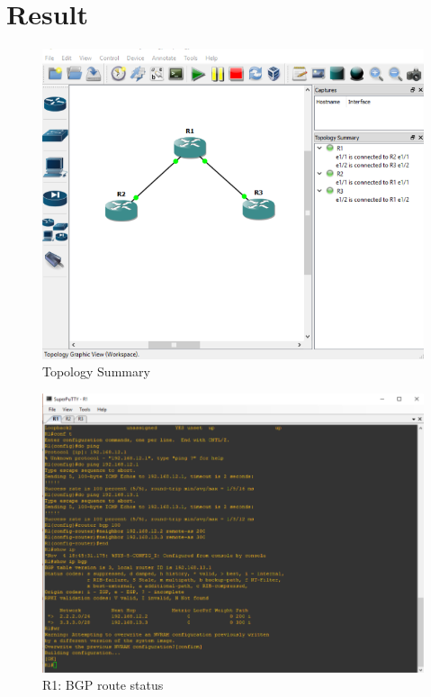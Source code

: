 \documentclass[paper=letter, fontsize=12pt]{article}
\begin{document}
\section{Result}
\begin{figure}[H]
	\setlength{\parindent}{-5em}
	\includegraphics[width=550px]{assets/topology}
	\caption{Topology Summary}
\end{figure}

\begin{figure}[H]
	\setlength{\parindent}{-5em}
	\includegraphics[width=550px]{assets/r1bgp}
	\caption{R1: BGP route status}
\end{figure}
\end{document}
